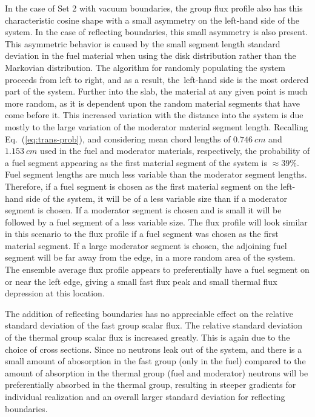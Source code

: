 \noindent
	\indent In the case of Set 2 with vacuum boundaries, the group flux profile also has this
	characteristic cosine shape with a small asymmetry on the left-hand side of the system.
	In the case of reflecting boundaries, this small asymmetry is also present.  This asymmetric
	behavior is caused by the small segment length standard deviation in the fuel material when using
	the disk distribution rather than the Markovian distribution.  The algorithm for randomly
	populating the system proceeds from left to right, and as a result, the~left-hand side is the most
	ordered part of the system.  Further into the slab, the material at any given point is
	much more random, as it is dependent upon the random material segments that have come
	before it.
	This increased variation with the distance into the system is due mostly to the large variation of the 
	moderator material segment length.  Recalling Eq.~(\ref{eq:trans-prob}), and considering
	mean chord lengths of ${0.746 \ cm }$ and ${1.153 \ cm}$ used in the fuel and moderator materials,
	respectively, the probability of a fuel segment appearing as the first material segment
	of the system is ${\approx39\%}$.  Fuel segment lengths are much less variable than the
	moderator segment lengths.  Therefore, if a fuel segment is chosen as the first material segment
	on the left-hand side
	of the system, it will be of a less variable size than if a moderator segment is chosen.  If a
	moderator segment is chosen and is small it will be followed by a fuel segment of a less variable
	size.  The flux profile will look similar in this scenario to the flux profile if a fuel segment was
	chosen as the first material segment.  If a large moderator segment
	is chosen, the adjoining fuel segment will be far away from the edge, in a more random
	area of the system.  The ensemble average flux profile appears to preferentially have a fuel 
	segment on or near the left edge, giving a small fast flux peak and small thermal flux depression at
	this location.  
	
\noindent
	\indent The addition of reflecting boundaries has no appreciable effect on the
	relative standard deviation of the fast group scalar flux.  The relative standard deviation
	of the thermal group scalar flux is increased greatly.  This is again due to the choice of cross
	sections.
	Since no neutrons leak out of the system, and there is a small amount of abosorption
	in the fast group (only in the fuel) compared to the amount of absorption in the 
	thermal group (fuel and moderator) neutrons will be preferentially absorbed in the thermal
	group, resulting in steeper gradients for individual realization and an overall larger standard
	deviation for reflecting boundaries.
 

